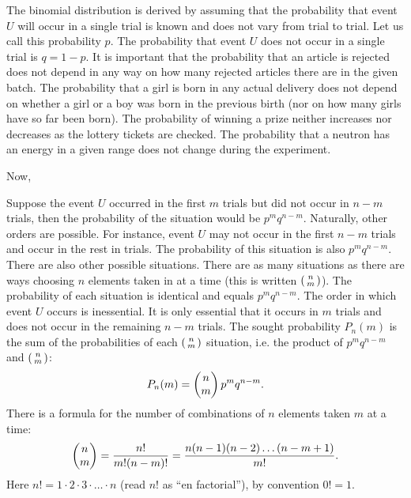 The binomial distribution is derived by assuming that the probability
that event $U$ will occur in a single trial is known and does not vary
from trial to trial. Let us call this probability $p$. The probability that
event $U$ does not occur in a single trial is $q= 1 - p$. It is important that
the probability that an article is rejected does not depend in any way on
how many rejected articles there are in the given batch. The probability
that a girl is born in any actual delivery does not depend on whether
a girl or a boy was born in the previous birth (nor on how many girls
have so far been born). The probability of winning a prize neither
increases nor decreases as the lottery tickets are checked. The
probability that a neutron has an energy in a given range does not
change during the experiment.

Now, 

Suppose the event $U$ occurred in the first $m$ trials but did not occur in
$n - m$ trials, then the probability of the situation would be $p^{m}q^{n-m}$.
Naturally, other orders are possible. For instance, event $U$ may not
occur in the first $n - m$ trials and occur in the rest in trials. The
probability of this situation is also $p^{m}q^{n-m}$. There are also other possible situations. There are as many situations as there are ways choosing
$n$ elements taken in at a time (this is written $\begin{psmallmatrix}n \\ m \end{psmallmatrix}$). The probability of each situation is identical and equals  $p^{m}q^{n-m}$. The order in which event $U$ occurs is inessential. It is only essential that it occurs in $m$ trials and does not occur in the remaining $n - m$ trials. The sought probability $P_{n}(m)$ is the sum of the probabilities of each $\begin{psmallmatrix}n \\ m \end{psmallmatrix}$ situation, i.e. the
product of  $p^{m}q^{n-m}$ and $\begin{psmallmatrix}n \\ m \end{psmallmatrix}$:
\begin{equation}%
P_{n}(m) = \mqty(n \\ m) \, p^{m}q^{n-m}.
\label{eq-1.7}
\end{equation}
There is a formula for the number of combinations of $n$ elements taken
$m$ at a time:
\begin{equation}%
\mqty(n \\ m)
= \frac{n!}{m! (n-m)!}
 = \frac{n(n-1)(n-2)\ldots (n-m+1)}{m!}.
\label{eq-1.8}
\end{equation}
Here $n! = 1 \cdot 2 \cdot 3 \cdot \ldots  \cdot n$ (read $n!$ as ``en factorial''), by convention $0 ! = 1$.

